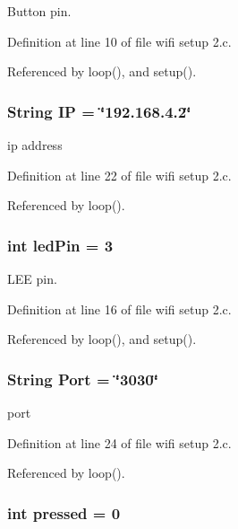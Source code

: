 Button pin. 



Definition at line 10 of file wifi setup 2.c.

Referenced by loop(), and setup().
\subsubsection{\setlength{\rightskip}{0pt plus 5cm}String {\bf IP} = \char`\"{}192.168.4.2\char`\"{}}\label{wifi_01setup_012_8c_a12a3079e14ced46e69ba52b8a90b21a}


ip address 



Definition at line 22 of file wifi setup 2.c.

Referenced by loop().
\subsubsection{\setlength{\rightskip}{0pt plus 5cm}int {\bf led\-Pin} = 3}\label{wifi_01setup_012_8c_08571f2409ba4af9200c2c471a9e6e1d}


LEE pin. 



Definition at line 16 of file wifi setup 2.c.

Referenced by loop(), and setup().
\subsubsection{\setlength{\rightskip}{0pt plus 5cm}String {\bf Port} = \char`\"{}3030\char`\"{}}\label{wifi_01setup_012_8c_60aaf44d4b562252c04db7f98497e9aa}


port 



Definition at line 24 of file wifi setup 2.c.

Referenced by loop().
\subsubsection{\setlength{\rightskip}{0pt plus 5cm}int {\bf pressed} = 0}\label{wifi_01setup_012_8c_6375592a2d987630e9bf9afd9e7de973}


